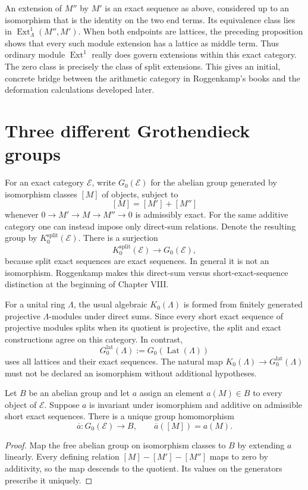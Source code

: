 An extension of $M''$ by $M'$ is an exact sequence as above, considered up to an isomorphism that is the identity on the two end terms. Its equivalence class lies in $\operatorname{Ext}^1_\Lambda(M'',M')$. When both endpoints are lattices, the preceding proposition shows that every such module extension has a lattice as middle term. Thus ordinary module $\operatorname{Ext}^1$ really does govern extensions within this exact category. The zero class is precisely the class of split extensions. This gives an initial, concrete bridge between the arithmetic category in Roggenkamp's books and the deformation calculations developed later.

\section{Three different Grothendieck groups}

For an exact category $\mathcal E$, write $G_0(\mathcal E)$ for the abelian group generated by isomorphism classes $[M]$ of objects, subject to
\[
[M]=[M']+[M'']
\]
whenever $0\to M'\to M\to M''\to0$ is admissibly exact. For the same additive category one can instead impose only direct-sum relations. Denote the resulting group by $K_0^{\mathrm{split}}(\mathcal E)$. There is a surjection
\[
K_0^{\mathrm{split}}(\mathcal E)\longrightarrow G_0(\mathcal E),
\]
because split exact sequences are exact sequences. In general it is not an isomorphism. Roggenkamp makes this direct-sum versus short-exact-sequence distinction at the beginning of Chapter VIII.\cite[Definitions VIII.1.2 and VIII.1.6]{v2Roggenkamp1970II}

For a unital ring $\Lambda$, the usual algebraic $K_0(\Lambda)$ is formed from finitely generated projective $\Lambda$-modules under direct sums. Since every short exact sequence of projective modules splits when its quotient is projective, the split and exact constructions agree on this category. In contrast,
\[
G_0^{\mathrm{lat}}(\Lambda)
  :=G_0(\operatorname{Lat}(\Lambda))
\]
uses all lattices and their exact sequences. The natural map $K_0(\Lambda)\to G_0^{\mathrm{lat}}(\Lambda)$ must not be declared an isomorphism without additional hypotheses.

\begin{proposition}
Let $B$ be an abelian group and let $a$ assign an element $a(M)\in B$ to every object of $\mathcal E$. Suppose $a$ is invariant under isomorphism and additive on admissible short exact sequences. There is a unique group homomorphism
\[
\overline a:G_0(\mathcal E)\longrightarrow B,
\qquad \overline a([M])=a(M).
\]
\end{proposition}
\begin{proof}
Map the free abelian group on isomorphism classes to $B$ by extending $a$ linearly. Every defining relation $[M]-[M']-[M'']$ maps to zero by additivity, so the map descends to the quotient. Its values on the generators prescribe it uniquely.
\end{proof}

